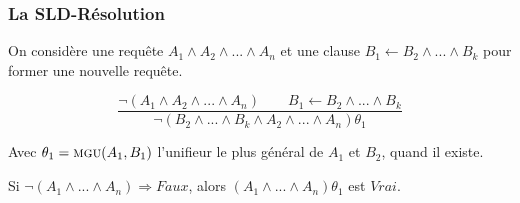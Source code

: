 \documentclass[aspectratio=43]{beamer}
\begin{document}
\begin{frame}[fragile]
  \frametitle{La SLD-Résolution}

  On considère une requête $A_{1} \wedge A_{2} \wedge ... \wedge A_{n}$ et une clause $B_{1} \leftarrow B_{2} \wedge ... \wedge B_{k}$ pour former une nouvelle requête.
  
  $$\frac{\neg(A_{1} \wedge A_{2} \wedge ... \wedge A_{n}) \qquad B_{1} \leftarrow B_{2} \wedge ... \wedge B_{k}}{\neg( B_{2} \wedge ... \wedge B_{k} \wedge A_{2} \wedge ... \wedge A_{n})\theta_{1}}$$
  
  \vspace{1em}
  Avec $\theta_{1} = \textsc{mgu}(A_{1}, B_{1})$ l'unifieur le plus général de $A_1$ et $B_2$, quand il existe.

  \vspace{1em}

  Si $\neg(A_{1} \wedge ... \wedge A_{n}) \Rightarrow Faux$, alors $(A_{1} \wedge ... \wedge A_{n})\theta_{1}$ est $Vrai$.
  

\end{frame}
\end{document}

